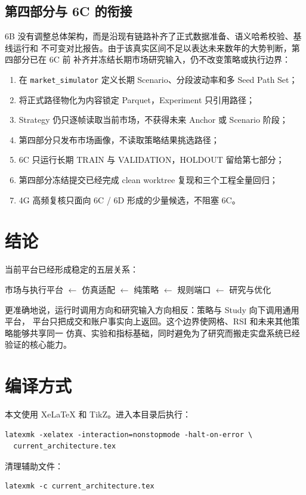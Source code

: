 \documentclass[UTF8,fontset=fandol,11pt,a4paper]{ctexart}
\newcommand{\code}[1]{\nolinkurl{#1}}
\begin{document}
\subsection{第四部分与 6C 的衔接}

6B 没有调整总体架构，而是沿现有链路补齐了正式数据准备、语义哈希校验、基线运行和
不可变对比报告。由于该真实区间不足以表达未来数年的大势判断，第四部分已在 6C 前
补齐并冻结长期市场研究输入，仍不改变策略或执行边界：

\begin{enumerate}
  \item 在 \code{market_simulator} 定义长期 Scenario、分段波动率和多 Seed Path Set；
  \item 将正式路径物化为内容锁定 Parquet，Experiment 只引用路径；
  \item Strategy 仍只逐帧读取当前市场，不获得未来 Anchor 或 Scenario 阶段；
  \item 第四部分只发布市场画像，不读取策略结果挑选路径；
  \item 6C 只运行长期 TRAIN 与 VALIDATION，HOLDOUT 留给第七部分；
  \item 第四部分冻结提交已经完成 clean worktree 复现和三个工程全量回归；
  \item 4G 高频复核只面向 6C / 6D 形成的少量候选，不阻塞 6C。
\end{enumerate}

\section{结论}

当前平台已经形成稳定的五层关系：

\begin{center}
\Large
市场与执行平台
$\longleftarrow$
仿真适配
$\longleftarrow$
纯策略
$\longleftarrow$
规则端口
$\longleftarrow$
研究与优化
\end{center}

更准确地说，运行时调用方向和研究输入方向相反：策略与 Study 向下调用通用平台，
平台只把成交和账户事实向上返回。这个边界使网格、RSI 和未来其他策略能够共享同一
仿真、实验和指标基础，同时避免为了研究而搬走实盘系统已经验证的核心能力。

\appendix
\section{编译方式}

本文使用 XeLaTeX 和 TikZ。进入本目录后执行：

\begin{verbatim}
latexmk -xelatex -interaction=nonstopmode -halt-on-error \
  current_architecture.tex
\end{verbatim}

清理辅助文件：

\begin{verbatim}
latexmk -c current_architecture.tex
\end{verbatim}
\end{document}
